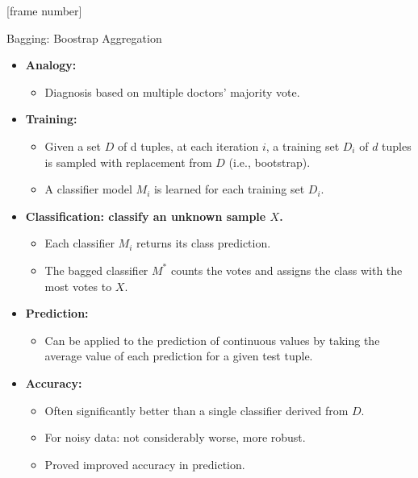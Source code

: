 \documentclass[aspectratio=169,t,table]{beamer}
\begin{document}
  {
    [frame number]
    \begin{frame}{Bagging: Boostrap Aggregation}
      \begin{itemize}
        \item \textbf{Analogy:}
        \begin{itemize}
          \item Diagnosis based on multiple doctors' majority vote.
        \end{itemize}
        \item \textbf{Training:}
        \begin{itemize}
          \item Given a set $D$ of d tuples, at each iteration $i$, a training set $D_i$ of $d$ tuples is sampled with replacement from $D$ (i.e., bootstrap).
          \item A classifier model $M_i$ is learned for each training set $D_i$.
        \end{itemize}
        \item \textbf{Classification: classify an unknown sample $X$.}
        \begin{itemize}
          \item Each classifier $M_i$ returns its class prediction.
          \item The bagged classifier $M^*$ counts the votes and assigns the class with the most votes to $X$.
        \end{itemize}
        \item \textbf{Prediction:}
        \begin{itemize}
          \item Can be applied to the prediction of continuous values by taking the average value of each prediction for a given test tuple.
        \end{itemize}
        \item \textbf{Accuracy:}
        \begin{itemize}
          \item Often significantly better than a single classifier derived from $D$.
          \item For noisy data: not considerably worse, more robust.
          \item Proved improved accuracy in prediction.
        \end{itemize}
      \end{itemize}
    \end{frame}
  }
\end{document}
